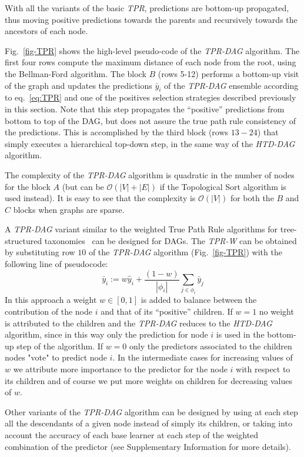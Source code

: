 \documentclass{bioinfo}
\begin{document}
\begin{methods}
With all the variants of the basic {\em TPR}, predictions are bottom-up propagated, thus moving positive predictions towards the parents and recursively towards the ancestors of each node.


Fig.~\ref{fig-TPR} shows the high-level pseudo-code of the {\em TPR-DAG} algorithm.
The first four rows compute the maximum distance of each node from the root, using the Bellman-Ford algorithm.
The block $B$ (rows 5-12) performs a bottom-up visit of the graph and updates the predictions $\bar{y}_i$ of the {\em TPR-DAG} ensemble according to eq.~\ref{eq:TPR} and one of the positives selection strategies described previously in this section.
Note that this step propagates the ``positive'' predictions from bottom to top of the DAG, but 
does not assure the true path rule consistency of the predictions.
This is accomplished by the third block (rows $13-24$) that simply executes a hierarchical top-down step, in the same way of the {\em HTD-DAG} algorithm.

The complexity of the {\em TPR-DAG} algorithm is quadratic in the number of nodes for the block $A$ (but can be  $\mathcal{O}(|V|+|E|)$ if the Topological Sort algorithm is used instead).
It is easy to see that the complexity is $\mathcal{O}(|V|)$ for both the $B$ and $C$ blocks when graphs are sparse.

A {\em TPR-DAG} variant similar to the weighted True Path Rule algorithms for tree-structured taxonomies~\cite{Vale12a} can be designed for DAGs.
The {\em TPR-W} can be obtained by substituting row $10$ of the {\em TPR-DAG} algorithm (Fig.~\ref{fig-TPR}) with the following line of pseudocode:
\begin{equation}
\bar{y}_i := w \hat{y}_i + \frac{(1 - w)}{|\phi_i|} \sum_{j \in \phi_i} \bar{y}_j
\label{eq:tpr-w}
\end{equation}
In this approach a weight $w \in [0,1]$ is added to balance between the contribution of the node $i$ and that of its ``positive'' children. If $w=1$ no weight is attributed to the children and the {\em TPR-DAG} reduces to the {\em HTD-DAG} algorithm, since in this way only the prediction for node $i$ is used in the bottom-up step of the algorithm.
If $w=0$ only the predictors associated to the children nodes "vote" to predict node $i$. In the intermediate cases for increasing values of $w$ we attribute more importance to the predictor for the node $i$ with respect to its children and of course we put more weights on children for decreasing values of $w$.

Other variants of the {\em TPR-DAG} algorithm can be designed by using at each step all the descendants of a given node instead of simply its children, or taking into account the accuracy of each base learner at each step of the weighted combination of the predictor (see Supplementary Information for more details).






\end{methods}
\end{document}
